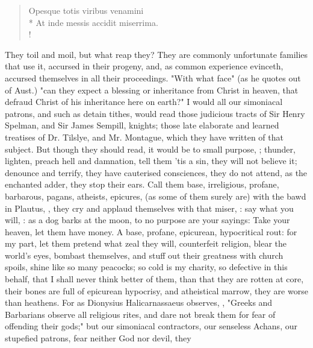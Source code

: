 \begin{latin}
\begin{verse}%
Opesque totis viribus venamini\\*
At inde messis accidit miserrima.\\!
\end{verse}%
\end{latin}

They toil and moil, but what reap they? They are commonly unfortunate families
that use it, accursed in their progeny, and, as common experience evinceth,
accursed themselves in all their proceedings. "With what face" (as
he quotes out of Aust.) "can they expect a blessing or
inheritance from Christ in heaven, that defraud Christ of his inheritance here
on earth?" I would all our simoniacal patrons, and such as detain tithes, would
read those judicious tracts of Sir Henry Spelman, and Sir James Sempill,
knights; those late elaborate and learned treatises of Dr. Tilslye, and Mr.
Montague, which they have written of that subject. But though they should read,
it would be to small purpose, ;
thunder, lighten, preach hell and damnation, tell them 'tis a sin, they will
not believe it; denounce and terrify, they have cauterised
consciences, they do not attend, as the enchanted adder, they stop their ears.
Call them base, irreligious, profane, barbarous, pagans, atheists, epicures,
(as some of them surely are) with the bawd in Plautus, , they
cry and applaud themselves with that miser, : say what you will, : as a
dog barks at the moon, to no purpose are your sayings: Take your heaven, let
them have money. A base, profane, epicurean, hypocritical rout: for my part,
let them pretend what zeal they will, counterfeit religion, blear the world's
eyes, bombast themselves, and stuff out their greatness with church spoils,
shine like so many peacocks; so cold is my charity, so defective in this
behalf, that I shall never think better of them, than that they are rotten at
core, their bones are full of epicurean hypocrisy, and atheistical marrow, they
are worse than heathens. For as Dionysius Halicarnassaeus observes,
 , \etc{} "Greeks and Barbarians observe all religious rites, and dare not
break them for fear of offending their gods;" but our simoniacal contractors,
our senseless Achans, our stupefied patrons, fear neither God nor devil, they
